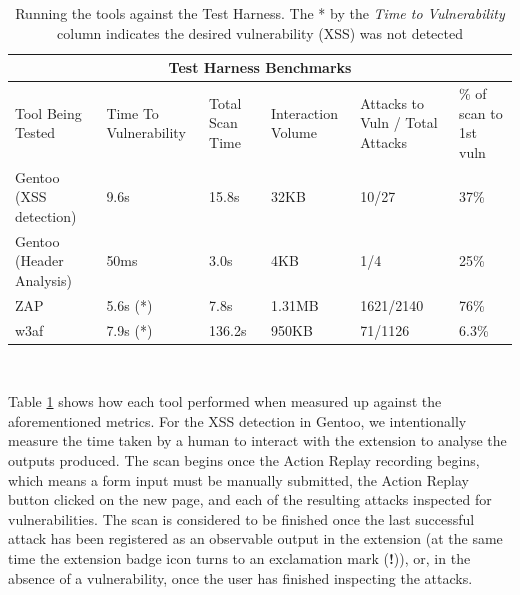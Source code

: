 \begin{table}[h]
	
{

	   \captionsetup{justification=centering}
	
	\caption{Running the tools against the Test Harness. The * by the \textit{Time to Vulnerability} column indicates the desired vulnerability (XSS) was not detected}
		\label{table:test_harness_benchmarks}
\begin{tabular}{ |p{4cm}||p{1.4cm}|p{1.4cm}|p{1.6cm}|p{2cm}|p{2cm}| }
	\hline
	\multicolumn{6}{|c|}{\textbf{Test Harness Benchmarks}} \\ [0.5ex]
	\hline \hline 
	Tool Being Tested& Time To Vulnerability & Total Scan Time & Interaction Volume & Attacks to Vuln / Total Attacks & \% of scan to 1st vuln \\
	\hline
	Gentoo (XSS detection)    & 9.6s      & 15.8s    & 32KB & 10/27 &37\% \\
	Gentoo (Header Analysis) & 50ms    &  3.0s    & 4KB&  1/4 &25\%\\
	ZAP                                   & 5.6s (*) & 7.8s      &  1.31MB &1621/2140 &76\%\\ 
	w3af                                 & 7.9s  (*) & 136.2s & 950KB & 71/1126 &6.3\%\\
	\hline
\end{tabular}
} \\
\end{table}

Table \ref{table:test_harness_benchmarks} shows how each tool performed when measured up against the aforementioned metrics. For the XSS detection in Gentoo, we intentionally measure the time taken by a human to interact with the extension to analyse the outputs produced. The scan begins once the Action Replay recording begins, which means a form input must be manually submitted, the Action Replay button clicked on the new page, and each of the resulting attacks inspected for vulnerabilities. The scan is considered to be finished once the last successful attack has been registered as an observable output in the extension (at the same time the extension badge icon turns to an exclamation mark (\textbf{!})), or, in the absence of a vulnerability, once the user has finished inspecting the attacks. \\

